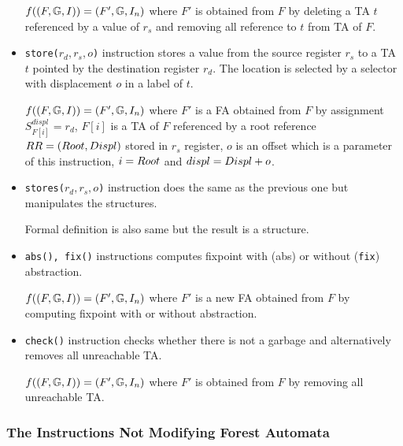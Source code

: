 \begin{itemize}
		$f((F, \mathbb{G}, I)) = (F', \mathbb{G}, I_n)$
		where $F'$ is obtained from $F$ by deleting a TA $t$ referenced
		by a value of $r_s$ and removing all reference to $t$ from TA of $F$.

	\item {\tt store($r_d,r_s,o$)} instruction stores a value from the source register $r_s$
		to a TA $t$ pointed by the destination register $r_d$.
		The location is selected by a selector with displacement $o$ in a label of $t$.
		
		$f((F, \mathbb{G}, I)) = (F', \mathbb{G}, I_n)$
		where $F'$ is a FA obtained from $F$ by assignment
		$S_{F[i]}^{displ} = r_{d}$,
		$F[i]$ is a TA of $F$ referenced by a root reference $RR=(Root,Displ)$ stored in $r_s$ register,
		$o$ is an offset which is a parameter of this instruction,
		$i=Root$ and $displ=Displ + o$.
	
	\item {\tt stores($r_d,r_s,o$)} instruction does the same as the previous
		one but manipulates the structures.
		
		Formal definition is also same but the result is a structure.

	\item {\tt abs(), fix()} instructions computes fixpoint with (abs) or
		without ({\tt fix}) abstraction.
		
		$f((F, \mathbb{G}, I)) = (F', \mathbb{G}, I_n)$
		where $F'$ is a new FA obtained from $F$ by computing fixpoint with or without abstraction.

	\item {\tt check()} instruction checks whether there is not a garbage
		and alternatively removes all unreachable TA.
		
		$f((F, \mathbb{G}, I)) = (F', \mathbb{G}, I_n)$
		where $F'$ is obtained from $F$ by removing all unreachable
		TA.

\end{itemize}

\subsubsection{The Instructions Not Modifying Forest Automata}


